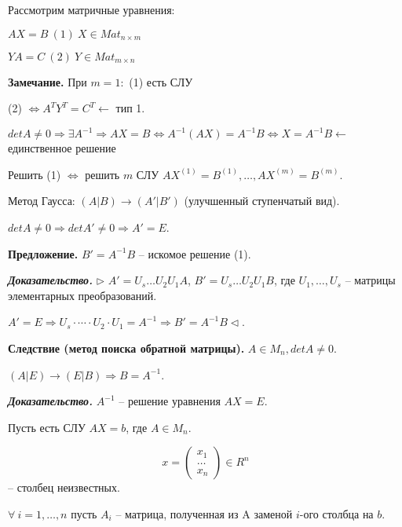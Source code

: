 Рассмотрим матричные уравнения:

$AX = B \ (1) \ X \in Mat_{n \times m}$

$YA = C \ (2) \ Y \in Mat_{m \times n}$

\vspace{\baselineskip}
\textbf{Замечание.} При $m=1:$ (1) есть СЛУ

(2) $\Leftrightarrow A^T Y^T = C^T \leftarrow$ тип 1.

$detA \neq 0 \Rightarrow \exists A^{-1} \Rightarrow AX = B \Leftrightarrow A^{-1}(AX)=A^{-1}B \Leftrightarrow X = A^{-1}B \leftarrow$ единственное решение

Решить (1) $\Leftrightarrow$ решить $m$ СЛУ $AX^{(1)} = B^{(1)}, \dots, AX^{(m)} = B^{(m)}$.

\vspace{\baselineskip}
Метод Гаусса: $(A|B) \rightarrow (A'|B')$ (улучшенный ступенчатый вид).

$detA \neq 0 \Rightarrow detA' \neq 0 \Rightarrow A' = E$.

\vspace{\baselineskip}
\textbf{Предложение.} $B' = A^{-1}B$ -- искомое решение (1).

\vspace{\baselineskip}
\textbf{\textit{Доказательство.}} $\rhd$ $A' = U_s \dots U_2 U_1 A$, $B' = U_s \dots U_2 U_1 B$, где $U_1, \dots, U_s$ -- матрицы элементарных преобразований.

$A' = E \Rightarrow U_s \cdot \cdots \cdot U_2 \cdot U_1 = A^{-1} \Rightarrow B' = A^{-1}B \lhd$.

\vspace{\baselineskip}
\textbf{Следствие (метод поиска обратной матрицы).} $A \in M_n, det A \neq 0$.

$(A|E) \rightarrow (E|B) \Rightarrow B = A^{-1}$.

\vspace{\baselineskip}
\textbf{\textit{Доказательство.}} $A^{-1}$ -- решение уравнения $AX=E$.

\vspace{\baselineskip}
Пусть есть СЛУ $AX = b$, где $A \in M_n$. 

\[x = \begin{pmatrix} x_1 \\ \dots \\ x_n \end{pmatrix} \in R^n
\] -- столбец неизвестных.

$\forall \ i = 1, \dots, n$ пусть $A_i$ -- матрица, полученная из A заменой $i$-ого столбца на $b$.

